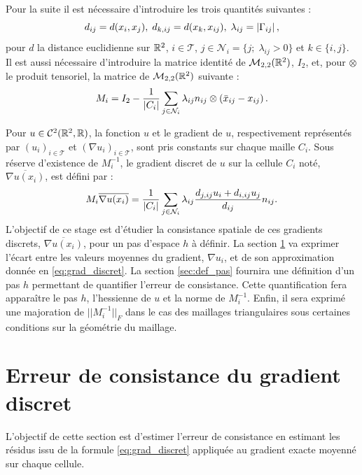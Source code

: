 \documentclass[12pt,a4paper]{article}
\begin{document}
	Pour la suite il est nécessaire d'introduire les trois quantités suivantes :
	\[
		d_{ij} = d(x_i,x_j),\; d_{k,ij} = d(x_k,x_{ij}),\; \lambda_{ij} = \left\lvert \Gamma_{ij} \right\rvert,
	\]
	pour $d$ la distance euclidienne sur $\mathbb{R}^2$, $i \in \mathcal T$, $j \in \mathcal{N}_i = \{j;\; \lambda_{ij} > 0\}$ et $k \in \{i,j\}$. Il est aussi nécessaire d'introduire la matrice identité de $\mathcal M_{2,2}(\mathbb{R}^2)$, $I_2$, et, pour $\otimes$ le produit tensoriel, la matrice de $\mathcal M_{2,2}(\mathbb{R}^2)$ suivante :
	\begin{equation}\label{eq:Mi}
		M_i = I_2 - \dfrac1{\left\lvert C_i \right\rvert}\displaystyle\sum_{j \in \mathcal N_i} \lambda_{ij} {n_{ij}}\otimes\left( {\bar x_{ij}-x_{ij}}\right).
	\end{equation}
	
	Pour $u \in \mathcal C^2(\mathbb{R}^2,\mathbb{R})$, la fonction $u$ et le gradient de $u$, respectivement représentés par $(u_i)_{i \in \mathcal T}$ et $(\nabla u_i)_{i\in \mathcal T}$, sont pris constants sur chaque maille $C_i$. Sous réserve d'existence de $M_i^{-1}$, le gradient discret de $u$ sur la cellule $C_i$ noté, $\overline{ {\nabla u}(x_i)}$, est défini par :
	\begin{equation}\label{eq:grad_discret}
		M_i \overline{ {\nabla u}(x_i)} = \dfrac1{\left\lvert C_i \right\rvert}\sum_{j \in \mathcal N_i} \lambda_{ij}\dfrac{d_{j,ij}u_i + d_{i,ij}u_j}{d_{ij}} {n_{ij}}.
	\end{equation}
	L'objectif de ce stage est d'étudier la consistance spatiale de ces gradients discrets, $\overline{ {\nabla u}(x_i)}$, pour un pas d'espace $h$ à définir. La section \ref{sec:err_consistance} va exprimer l'écart entre les valeurs moyennes du gradient, $\nabla u_i$, et de son approximation donnée en \eqref{eq:grad_discret}. La section \ref{sec:def_pas} fournira une définition d'un pas $h$ permettant de quantifier l'erreur de consistance. Cette quantification fera apparaître le pas $h$, l'hessienne de $u$ et la norme de $M_i^{-1}$. Enfin, il sera exprimé une majoration de $|\!|M_i^{-1}|\!|_F$ dans le cas des maillages triangulaires sous certaines conditions sur la géométrie du maillage.
	
	\vspace{-.5cm}
	
	\section{Erreur de consistance du gradient discret}\label{sec:err_consistance}
	
	L'objectif de cette section est d'estimer l'erreur de consistance en estimant les résidus issu de la formule \eqref{eq:grad_discret} appliquée au gradient exacte moyenné sur chaque cellule.
	
\end{document}
